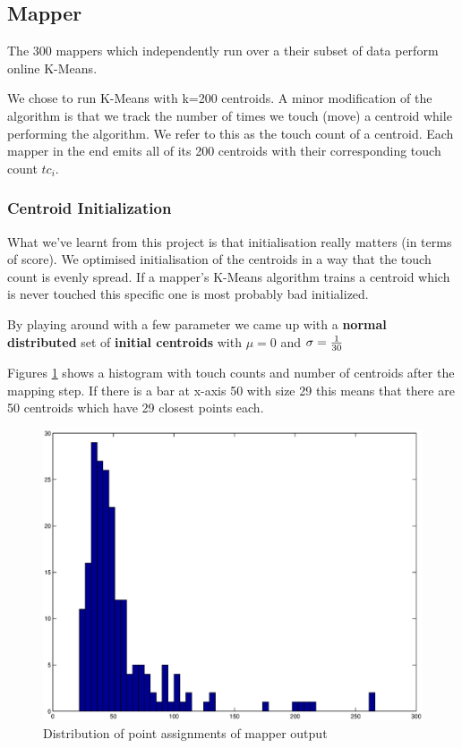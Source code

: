 \documentclass[a4paper, 11pt]{article}
\begin{document}
\subsection{Mapper}
The 300 mappers which independently run over a their subset of data perform online K-Means.

We chose to run K-Means with k=200 centroids. A minor modification of the algorithm is that we track the number of times we touch (move) a centroid while performing the algorithm. We refer to this as the touch count of a centroid. Each mapper in the end emits all of its 200 centroids with their corresponding touch count $tc_i$.


\subsubsection{Centroid Initialization}
What we've learnt from this project is that initialisation really matters (in terms of score). We optimised initialisation of the centroids in a way that the touch count is evenly spread. If a mapper's K-Means algorithm trains a centroid which is never touched this specific one is most probably bad initialized.

By playing around with a few parameter we came up with a \textbf{normal distributed} set of \textbf{initial centroids} with $\mu = 0$ and $\sigma = {1 \over 30}$


Figures \ref{fig:proj3-initialisation} shows a histogram with touch counts and number of centroids after the mapping step. If there is a bar at x-axis 50 with size 29 this means that there are 50 centroids which have 29 closest points each.


\begin{figure}[H]
\centering
\includegraphics[scale=0.35]{histogram.eps}
\caption{Distribution of point assignments of mapper output}
\label{fig:proj3-initialisation}
\end{figure}
\end{document}
